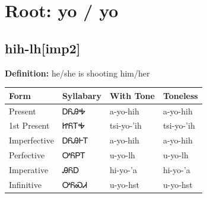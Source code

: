 \documentclass{article}%
\begin{document}
%
\normalsize%
\section*{Root: yo / yo}%
\subsection*{hih-lh[imp2]}%
\textbf{Definition: }%
he/she is shooting him/her%
\\[0.5em]%
\begin{tabular}{|l|l|l|l|}%
\hline%
\textbf{Form}&\textbf{Syllabary}&\textbf{With Tone}&\textbf{Toneless}\\%
\hline%
Present&ᎠᏲᎯᎭ&a{-}yo{-}hih&a{-}yo{-}hih\\%
1st Present&ᏥᏲᎢᎭ&tsi{-}yo{-}'ih&tsi{-}yo{-}'ih\\%
Imperfective&ᎠᏲᎯᎰᎢ&a{-}yo{-}hih&a{-}yo{-}hih\\%
Perfective&ᎤᏲᏢᎢ&u{-}yo{-}lh&u{-}yo{-}lh\\%
Imperative&ᎯᏲᎠ&hi{-}yo{-}'a&hi{-}yo{-}'a\\%
Infinitive&ᎤᏲᏍᏗ&u{-}yo{-}hst&u{-}yo{-}hst\\%
\hline%
\end{tabular}%
\\[1em]%
\end{document}
